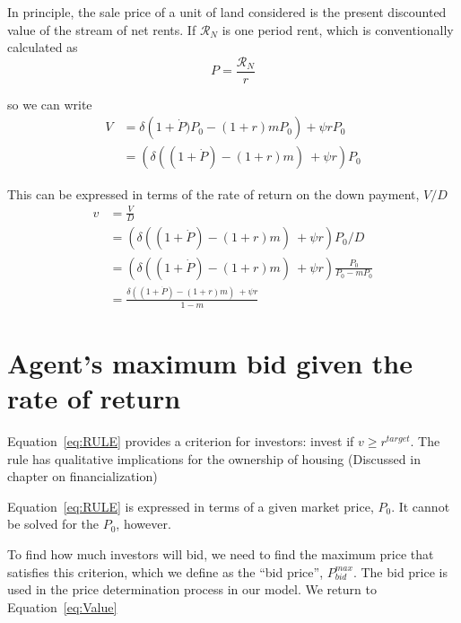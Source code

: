 
In principle, the  sale price of a unit of land considered is the present discounted value of the stream of net rents. If $\mathcal{R}_N$ is one period rent, which is conventionally calculated as
\begin{equation}
  P=\frac{\mathcal{R}_N}{r}  \label{eq:Capitalization}
\end{equation}


\noindent so we can write
\begin{align}  
    V & = \delta \left(1+\dot P)  P_0- (1+r)mP_0 \right)  + \psi rP_0  \\
    & =\left( \delta ((1+\dot P)  - (1+r)m)\  + \psi r\right)P_0
\end{align}

This can be expressed in terms of the rate of return on the down payment, $V/D$
\begin{align}  
   v & = \frac{V}{D}
   \\
    & = \left( \delta ((1+\dot P)  - (1+r)m)\  + \psi r\right)P_0/D
   \\
    & = \left( \delta ((1+\dot P)  - (1+r)m)\  + \psi r\right) \frac{P_0}{P_0-mP_0}
    \\
    & =  \frac{\delta ((1+\dot P)  - (1+r)m)\  + \psi r}{1-m}\label{eq:RULE}
\end{align}


\section{Agent's maximum bid given the rate of return}
Equation~\ref{eq:RULE} provides a criterion for investors: invest if $v \geq r^{target}$. The rule has qualitative implications for the ownership of housing (Discussed in chapter on financialization)

Equation~\ref{eq:RULE} is expressed in terms of a given market price, $P_0$. It cannot be solved for the $P_0$, however.

To find how much investors will bid, we need to find the maximum price that satisfies this criterion, which we define as the ``bid price'', $P^{max}_{bid}$.   The bid price is used in the price determination process in our model. We return to Equation~\ref{eq:Value} %

